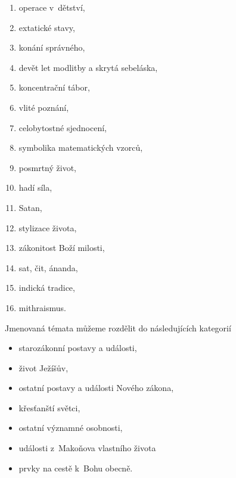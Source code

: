 \begin{enumerate}
\item{operace v~dětství,}
\item{extatické stavy,}
\item{konání správného,}
\item{devět let modlitby a skrytá sebeláska,}
\item{koncentrační tábor,}
\item{vlité poznání,\\}

\item{celobytostné sjednocení,}
\item{symbolika matematických vzorců,}
\item{posmrtný život,}
\item{hadí síla,}
\item{Satan,}
\item{stylizace života,}
\item{zákonitost Boží milosti,}
\item{sat, čit, ánanda,}
\item{indická tradice,}
\item{mithraismus.}

\end{enumerate}

Jmenovaná témata můžeme rozdělit do následujících kategorií
\begin{itemize}
\item{starozákonní postavy a události,}
\item{život Ježíšův,}
\item{ostatní postavy a události Nového zákona,}
\item{křesťanští světci,}
\item{ostatní významné osobnosti,}
\item{události z~Makoňova vlastního života}
\item{prvky na cestě k~Bohu obecně.}
\end{itemize}

